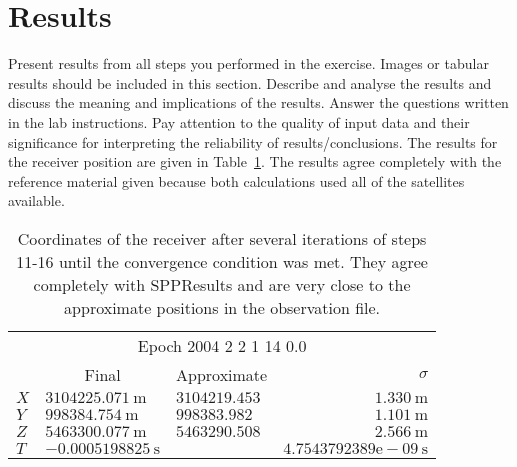 \section{Results} %
\label{sec:results}

Present results from all steps you performed in the exercise. Images or tabular results should be included in this section. Describe and analyse the results and discuss the meaning and implications of the results. Answer the questions written in the lab instructions. Pay attention to the quality of input data and their significance for interpreting the reliability of results/conclusions.
The results for the receiver position are given in Table~\ref{tab:receiverCoordinates}.  The results agree completely with the reference material given because both calculations used all of the satellites available.
\begin{table}[h]
	\begin{center}
		\begin{tabular}{lllr}
		\toprule
		\multicolumn{4}{c}{Epoch 2004 2 2 1 14 0.0} \\ 
		& \multicolumn{1}{c}{Final} & \multicolumn{1}{c}{Approximate} & \multicolumn{1}{r}{$\sigma$} \\
		\cmidrule(r){2-4} 
			$X$ & $ 3104225.071~\text{m}$		&$3104219.453$ & $1.330~\text{m}$		\\
			$Y$ & $ 998384.754~\text{m}$		&$998383.982$  & $1.101~\text{m}$	\\
			$Z$ & $ 5463300.077~\text{m}$		&$5463290.508$ & $2.566~\text{m}$		\\
			$T$ & $ -0.0005198825~\text{s}$ 	& 			   & $4.7543792389\text{e}-09~\text{s}$		\\
		\bottomrule
		\end{tabular}
	\end{center}
	\caption{Coordinates of the receiver after several iterations of steps 11-16 until the convergence condition was met.  They agree completely with SPPResults and are very close to the approximate positions in the observation file.}
	\label{tab:receiverCoordinates}
\end{table}


